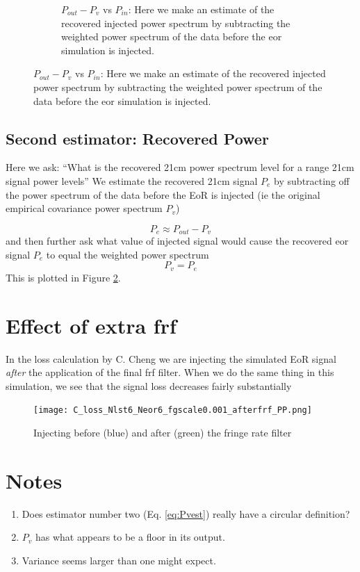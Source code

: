 \documentclass{article}
\begin{document}
\begin{figure}[bth]
\begin{center}
\begin{subfigure}{0.45\textwidth}
     \caption{$P_{out}-P_v$ vs $P_{in}$: Here we make an estimate of the recovered injected power spectrum by    subtracting the weighted power spectrum of the data before the eor simulation is injected.}\label{fig:eorvin}
   \end{subfigure}
\end{center}
\end{figure}
\subsection*{Second estimator: Recovered Power} 
Here we ask: ``What is the recovered 21cm power spectrum level for a range 21cm signal power levels''  We estimate the recovered 21cm signal $P_e$ by subtracting off the power spectrum of the data before the EoR is injected (ie the original empirical covariance power spectrum $P_{v}$)

\begin{equation}
P_{e} \approx P_{out} - P_v
\label{eq:Pvest}
\end{equation}
and then further ask what value of injected signal would cause the recovered eor signal $P_e$ to equal the weighted power spectrum
\begin{equation}
P_v = P_e 
\end{equation}
This is plotted in Figure \ref{fig:eorvin}. 



\section*{Effect of extra frf}
In the loss calculation by C. Cheng we are injecting the simulated EoR signal \emph{after} the application of the final frf filter. When we do the same thing in this simulation, we see that the signal loss decreases fairly substantially
\begin{figure}[htb]
\centering
\texttt{[image: C\_loss\_Nlst6\_Neor6\_fgscale0.001\_afterfrf\_PP.png]}
\caption{Injecting before (blue) and after (green) the fringe rate filter}\label{fig:afterfrf}
\end{figure}


\section*{Notes}
\begin{enumerate}
\item Does estimator number two (Eq. \ref{eq:Pvest}) really have a circular definition?
\item  $P_v$ has what appears to be a floor in its output. 
\item Variance seems larger than one might expect.
\end{enumerate}
\end{document}
